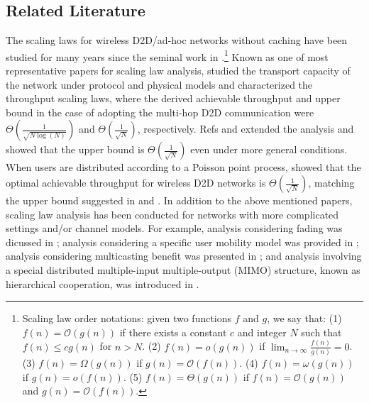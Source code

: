 \documentclass[journal,draftclsnofoot,onecolumn,12pt,twoside]{IEEEtran}
\begin{document}
\subsection{Related Literature}

The scaling laws for wireless D2D/ad-hoc networks without caching have been studied for many years since the seminal work in \cite{gupta2000capacity}.\footnote{Scaling law order notations: given two functions $f$ and $g$, we say that: (1) $f(n)=\mathcal{O}(g(n))$ if there exists a constant $c$ and integer $N$ such that $f(n)\leq cg(n)$ for $n>N$. (2) $f(n)=o(g(n))$ if $\displaystyle{\lim_{n\to\infty}}\frac{f(n)}{g(n)}=0$. (3) $f(n)=\Omega(g(n))$ if $g(n)=\mathcal{O}(f(n))$. (4) $f(n)=\omega(g(n))$ if $g(n)=o(f(n))$. (5) $f(n)=\Theta(g(n))$ if $f(n)=\mathcal{O}(g(n))$ and $g(n)=\mathcal{O}(f(n))$.} Known as one of most representative papers for scaling law analysis, \cite{gupta2000capacity} studied the transport capacity of the network under protocol and physical models and characterized the throughput scaling laws, where the derived achievable throughput and upper bound in the case of adopting the multi-hop D2D communication were $\Theta\left(\frac{1}{\sqrt{N\log(N)}}\right)$ and $\Theta\left(\frac{1}{\sqrt{N}}\right)$, respectively. Refs \cite{agarwal2004capacity} and \cite{xue2006scaling} extended the analysis and showed that the upper bound is $\Theta\left(\frac{1}{\sqrt{N}}\right)$ even under more general conditions. When users are distributed according to a Poisson point process, \cite{franceschetti2007closing} showed that the optimal achievable throughput for wireless D2D networks is $\Theta\left(\frac{1}{\sqrt{N}}\right)$, matching the upper bound suggested in  \cite{agarwal2004capacity} and \cite{xue2006scaling}. In addition to the above mentioned papers, scaling law analysis has been conducted for networks with more complicated settings and/or channel models. For example, analysis considering fading was dicussed in \cite{xue2006scaling}; analysis considering a specific user mobility model was provided in \cite{el2006optimal_I}; analysis considering multicasting benefit was presented in \cite{shakkottai2010multicast}; and analysis involving a special distributed multiple-input multiple-output (MIMO) structure, known as hierarchical cooperation, was introduced in \cite{ozgur2007hierarchical}.
\end{document}
